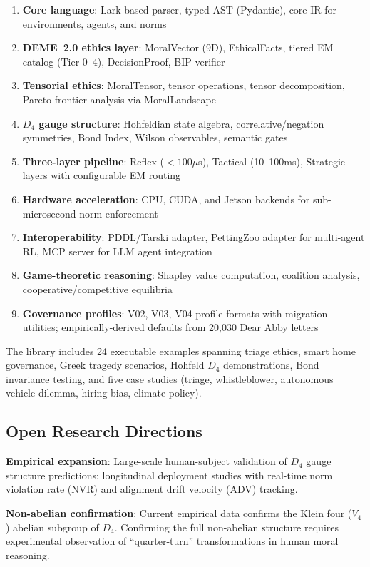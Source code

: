 \documentclass[conference]{IEEEtran}
\begin{document}
\begin{enumerate}
\item \textbf{Core language}: Lark-based parser, typed AST (Pydantic), core IR for environments, agents, and norms
\item \textbf{DEME~2.0 ethics layer}: MoralVector (9D), EthicalFacts, tiered EM catalog (Tier 0--4), DecisionProof, BIP verifier
\item \textbf{Tensorial ethics}: MoralTensor, tensor operations, tensor decomposition, Pareto frontier analysis via MoralLandscape
\item \textbf{$D_4$ gauge structure}: Hohfeldian state algebra, correlative/negation symmetries, Bond Index, Wilson observables, semantic gates
\item \textbf{Three-layer pipeline}: Reflex ($<100\mu$s), Tactical (10--100ms), Strategic layers with configurable EM routing
\item \textbf{Hardware acceleration}: CPU, CUDA, and Jetson backends for sub-microsecond norm enforcement
\item \textbf{Interoperability}: PDDL/Tarski adapter, PettingZoo adapter for multi-agent RL, MCP server for LLM agent integration
\item \textbf{Game-theoretic reasoning}: Shapley value computation, coalition analysis, cooperative/competitive equilibria
\item \textbf{Governance profiles}: V02, V03, V04 profile formats with migration utilities; empirically-derived defaults from 20,030 Dear Abby letters
\end{enumerate}

The library includes 24 executable examples spanning triage ethics, smart home governance, Greek tragedy scenarios, Hohfeld $D_4$ demonstrations, Bond invariance testing, and five case studies (triage, whistleblower, autonomous vehicle dilemma, hiring bias, climate policy).

\subsection{Open Research Directions}

\textbf{Empirical expansion}: Large-scale human-subject validation of $D_4$ gauge structure predictions; longitudinal deployment studies with real-time norm violation rate (NVR) and alignment drift velocity (ADV) tracking.

\textbf{Non-abelian confirmation}: Current empirical data confirms the Klein four ($V_4$) abelian subgroup of $D_4$. Confirming the full non-abelian structure requires experimental observation of ``quarter-turn'' transformations in human moral reasoning.
\end{document}
